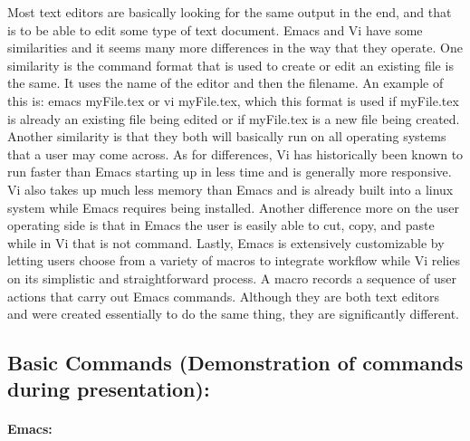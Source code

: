 \documentclass{article} %
\begin{document}
\noindent 

\noindent 

\noindent Most text editors are basically looking for the same output in the end, and that is to be able to edit some type of text document. Emacs and Vi have some similarities and it seems many more differences in the way that they operate. One similarity is the command format  that is used to create or edit an existing file is the same. It uses the name of the editor and then the filename. An example of this is: emacs myFile.tex or vi myFile.tex, which this format is used if myFile.tex is already an existing file being edited or if myFile.tex is a new file being created. Another similarity is that they both will basically run on all operating systems that a user may come across. As for differences, Vi has historically been known to run faster than Emacs starting up in less time and is generally more responsive. Vi also takes up much less memory than Emacs and is already built into a linux system while Emacs requires being installed. Another difference more on the user operating side is that in Emacs the user is easily able to cut, copy, and paste while in Vi that is not command. Lastly, Emacs is extensively customizable by letting users choose from a variety of macros to integrate workflow while Vi relies on its simplistic and straightforward process. A macro records a sequence of user actions that carry out Emacs commands. Although they are both text editors and were created essentially to do the same thing, they are significantly different.

\noindent 

\noindent 
\subsection{Basic Commands (Demonstration of commands during presentation):}

\noindent 

\noindent 
\paragraph{Emacs:}

\noindent 
\end{document}
